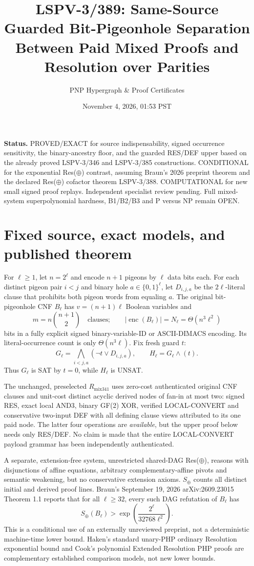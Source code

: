 \documentclass[11pt]{article}
\title{LSPV-3/389: Same-Source Guarded Bit-Pigeonhole Separation Between Paid Mixed Proofs and Resolution over Parities}
\author{PNP Hypergraph \& Proof Certificates}
\date{November 4, 2026, 01:53 PST}
\begin{document}
\maketitle
\noindent\textbf{Status.} PROVED/EXACT for source indispensability, signed occurrence sensitivity, the binary-ancestry floor, and the guarded RES/DEF upper based on the already proved LSPV-3/346 and LSPV-3/385 constructions. CONDITIONAL for the exponential Res($\oplus$) contrast, assuming Braun's 2026 preprint theorem and the declared Res($\oplus$) cofactor theorem LSPV-3/388. COMPUTATIONAL for new small signed proof replays. Independent specialist review pending. Full mixed-system superpolynomial hardness, B1/B2/B3 and P versus NP remain OPEN.

\section*{Fixed source, exact models, and published theorem}
For $\ell\ge1$, let $n=2^\ell$ and encode $n+1$ pigeons by $\ell$ data bits each. For each distinct pigeon pair $i<j$ and binary hole $a\in\{0,1\}^\ell$, let $D_{i,j,a}$ be the $2\ell$-literal clause that prohibits both pigeon words from equaling $a$. The original bit-pigeonhole CNF $B_\ell$ has $v=(n+1)\ell$ Boolean variables and
\[
m=n\binom{n+1}{2}\quad\text{clauses};\qquad
|\operatorname{enc}(B_\ell)|=N_\ell=\Theta(n^3\ell^2)
\]
bits in a fully explicit signed binary-variable-ID or ASCII-DIMACS encoding. Its literal-occurrence count is only $\Theta(n^3\ell)$. Fix fresh guard $t$:
\[
G_\ell=\bigwedge_{i<j,a}(\neg t\lor D_{i,j,a}),
\qquad H_\ell=G_\ell\land(t).
\]
Thus $G_\ell$ is SAT by $t=0$, while $H_\ell$ is UNSAT.

The unchanged, preselected $R_{\mathrm{mix341}}$ uses zero-cost authenticated original CNF clauses and unit-cost distinct acyclic derived nodes of fan-in at most two: signed RES, exact local AND3, binary GF(2) XOR, verified LOCAL-CONVERT and conservative two-input DEF with all defining clause views attributed to its one paid node. The latter four operations are \emph{available}, but the upper proof below needs only RES/DEF. No claim is made that the entire LOCAL-CONVERT payload grammar has been independently authenticated.

A separate, extension-free system, unrestricted shared-DAG Res($\oplus$), reasons with disjunctions of affine equations, arbitrary complementary-affine pivots and semantic weakening, but no conservative extension axioms. $S_\oplus$ counts all distinct initial and derived proof lines. Braun's September 19, 2026 arXiv:2609.23015 Theorem 1.1 reports that for all $\ell\ge32$, every such DAG refutation of $B_\ell$ has
\[
S_\oplus(B_\ell)>\exp\left(\frac{2^\ell}{32768\ell^2}\right).
\]
This is a conditional use of an externally unreviewed preprint, not a deterministic machine-time lower bound. Haken's standard unary-PHP ordinary Resolution exponential bound and Cook's polynomial Extended Resolution PHP proofs are complementary established comparison models, not new lower bounds.
\end{document}
